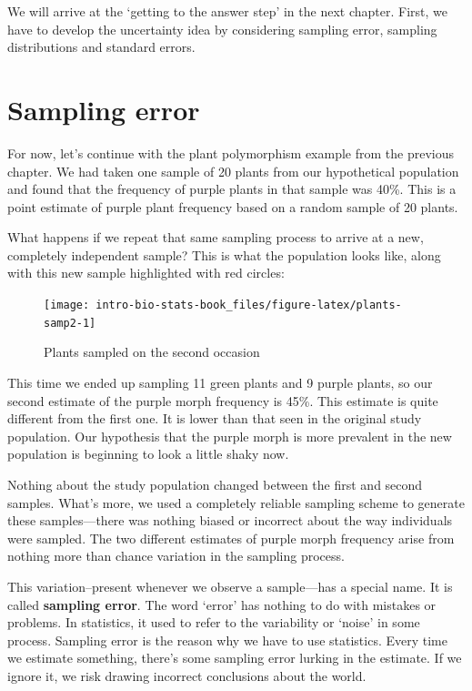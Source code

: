 \documentclass[
]{book}
\begin{document}
We will arrive at the `getting to the answer step' in the next chapter. First, we have to develop the uncertainty idea by considering sampling error, sampling distributions and standard errors.

\hypertarget{sampling-error-1}{%
\section{Sampling error}\label{sampling-error-1}}

For now, let's continue with the plant polymorphism example from the previous chapter. We had taken one sample of 20 plants from our hypothetical population and found that the frequency of purple plants in that sample was 40\%. This is a point estimate of purple plant frequency based on a random sample of 20 plants.

What happens if we repeat that same sampling process to arrive at a new, completely independent sample? This is what the population looks like, along with this new sample highlighted with red circles:

\begin{figure}

{\centering \texttt{[image: intro-bio-stats-book\_files/figure-latex/plants-samp2-1]} 

}

\caption{Plants sampled on the second occasion}\label{fig:plants-samp2}
\end{figure}

This time we ended up sampling 11 green plants and 9 purple plants, so our second estimate of the purple morph frequency is 45\%. This estimate is quite different from the first one. It is lower than that seen in the original study population. Our hypothesis that the purple morph is more prevalent in the new population is beginning to look a little shaky now.

Nothing about the study population changed between the first and second samples. What's more, we used a completely reliable sampling scheme to generate these samples---there was nothing biased or incorrect about the way individuals were sampled. The two different estimates of purple morph frequency arise from nothing more than chance variation in the sampling process.

This variation--present whenever we observe a sample---has a special name. It is called \textbf{sampling error}. The word `error' has nothing to do with mistakes or problems. In statistics, it used to refer to the variability or `noise' in some process. Sampling error is the reason why we have to use statistics. Every time we estimate something, there's some sampling error lurking in the estimate. If we ignore it, we risk drawing incorrect conclusions about the world.
\end{document}
